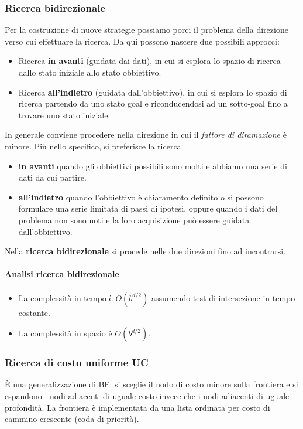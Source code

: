\subsubsection{Ricerca bidirezionale}
Per la costruzione di nuove strategie possiamo porci il problema della direzione verso cui
effettuare la ricerca.
Da qui possono nascere due possibili approcci:
\begin{itemize}
	\item Ricerca \textbf{in avanti} (guidata dai dati), in cui si esplora lo spazio di
	      ricerca dallo stato iniziale allo stato obbiettivo.
	\item Ricerca \textbf{all'indietro} (guidata dall'obbiettivo), in cui si esplora lo
	      spazio di ricerca partendo da uno stato goal e riconducendosi ad un sotto-goal
	      fino a trovare uno stato iniziale.
\end{itemize}
In generale conviene procedere nella direzione in cui il \emph{fattore di diramazione}
\`e minore.
Pi\`u nello specifico, si preferisce la ricerca
\begin{itemize}
	\item \textbf{in avanti} quando gli obbiettivi possibili sono molti e abbiamo una
	      serie di dati da cui partire.
	\item \textbf{all'indietro} quando l'obbiettivo \`e chiaramento definito o si possono
	      formulare una serie limitata di passi di ipotesi, oppure quando i dati del
	      problema non sono noti e la loro acquisizione pu\`o essere guidata
	      dall'obbiettivo.
\end{itemize}
Nella \textbf{ricerca bidirezionale} si procede nelle due direzioni fino ad incontrarsi.

\paragraph{Analisi ricerca bidirezionale}
\begin{itemize}
	\item La complessit\`a in tempo \`e $O(b^{d/2})$ assumendo test di intersezione in
	      tempo costante.
	\item La complessit\`a in spazio \`e $O(b^{d/2})$.
\end{itemize}

\subsubsection{Ricerca di costo uniforme UC}
\`E una generalizzazione di BF: si sceglie il nodo di costo minore
sulla frontiera e si espandono i nodi adiacenti di uguale costo invece che i nodi
adiacenti di uguale profondit\`a.
La frontiera \`e implementata da una lista ordinata per costo di cammino crescente (coda
di priorit\`a).

